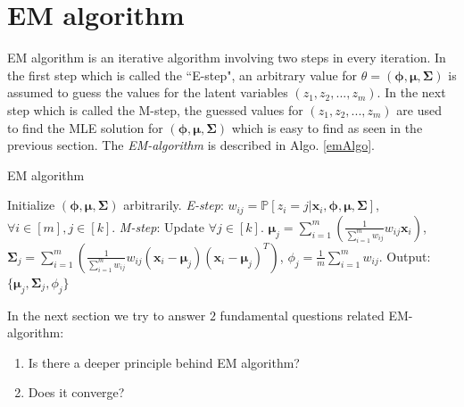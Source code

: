 \documentclass[a4paper,english,12pt]{article}
\begin{document}
\section{EM algorithm}
EM algorithm is an iterative algorithm involving two steps in every iteration. In the first step which is called the ``E-step", an arbitrary value for $\theta=\left(\pmb{\phi},\boldsymbol{\mu},\boldsymbol{\Sigma}\right)$ is assumed to guess the values for the latent variables $(z_1, z_2, ... , z_m)$. In the next step which is called the M-step, the guessed values for $(z_1, z_2, ... , z_m)$ are used to find the MLE solution for $\left(\pmb{\phi},\boldsymbol{\mu},\boldsymbol{\Sigma}\right)$ which is easy to find as seen in the previous section. The \textit{EM-algorithm} is described in Algo. \ref{emAlgo}.
\begin{algorithm}
\caption{EM algorithm}\label{emAlgo}
\begin{algorithmic}[1]
\State Initialize  $\left(\pmb{\phi},\boldsymbol{\mu},\boldsymbol{\Sigma}\right)$ arbitrarily.
\State \emph{E-step}:
\State $w_{ij} = \mathbb{P}[z_i = j|\boldsymbol{x}_i, \pmb{\phi},\boldsymbol{\mu},\boldsymbol{\Sigma}]$, $\forall i \in [m], j \in [k]$.
\State \emph{M-step}: Update
\State $\forall j \in [k]$.
\State $\boldsymbol{\mu}_j = \sum\limits_{i=1}^{m} \left(\frac{1}{\sum\limits_{i=1}^m w_{ij}}w_{ij}\boldsymbol{x}_i\right)$, $\boldsymbol{\Sigma}_j = \sum\limits_{i=1}^{m} \left(\frac{1}{\sum\limits_{i=1}^m w_{ij}}w_{ij}(\boldsymbol{x}_i-\boldsymbol{\mu}_j)(\boldsymbol{x}_i-\boldsymbol{\mu}_j)^T\right)$,
\State $ \phi_j=\frac{1}{m}\sum\limits_{i=1}^m w_{ij}$.
\EndWhile
\State Output: $\{\boldsymbol{\mu}_j,\boldsymbol{\Sigma}_j,\phi_j\}$ 
\end{algorithmic}
\end{algorithm}
\par In the next section we try to answer $2$ fundamental questions related EM-algorithm:
\begin{enumerate}
\item Is there a deeper principle behind EM algorithm?
\item Does it converge?
\end{enumerate}
\end{document}
